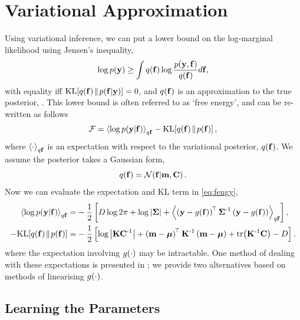 \documentclass{article} %
\begin{document}
\section{Variational Approximation}

Using variational inference, we can put a lower bound on the log-marginal
likelihood using Jensen's inequality, 
\begin{equation}
    \log p\!\left({\mathbf{y}}\right) \geq \int q\!\left({\mathbf{f}}\right) \log 
        \frac{p\!\left({\mathbf{y}, \mathbf{f}}\right)}{q\!\left({\mathbf{f}}\right)} d\mathbf{f},
\end{equation}
with equality iff $\text{KL}\!\left[{{q\!\left({\mathbf{f}}\right)}\!\parallel\!{p\!\left({\mathbf{f}}\middle\vert{\ensuremath{\mathbf{y}}}\right)}}\right] = 0$, and
$q\!\left({\mathbf{f}}\right)$ is an approximation to the true posterior,
\probC{\lstate}{\obs}. This lower bound is often referred to as `free energy',
and can be re-written as follows
\begin{equation}
    \mathcal{F} = \left\langle{\log \ensuremath{p\!\left({\mathbf{y}}\middle\vert{\ensuremath{\mathbf{f}}}\right)}}\right\rangle_{q\mathbf{f}}
        - \text{KL}\!\left[{{q\!\left({\mathbf{f}}\right)}\!\parallel\!{p\!\left({\mathbf{f}}\right)}}\right],
    \label{eq:fengy}
\end{equation}
where $\left\langle{\cdot}\right\rangle_{q\mathbf{f}}$ is an expectation with respect to the
variational posterior, $q\!\left({\mathbf{f}}\right)$. We assume the posterior takes a
Gaussian form,
\begin{equation}
    q\!\left({\mathbf{f}}\right) = \mathcal{N}\!\left({\mathbf{f}}\middle\vert{\ensuremath{\mathbf{m}}, \ensuremath{\mathbf{C}}}\right). \label{eq:varpost}
\end{equation}
Now we can evaluate the expectation and KL term in \eqref{eq:fengy},
\begin{align}
    \expec{q\lstate}{\log \probC{\obs}{\lstate}}
        =& - \frac{1}{2} \sbrac{ 
            D\log{2\pi} + \log\deter{\lcov} 
            + \expec{q\lstate}{\brac{\obs - \nonlin{\lstate}}\transpose\lcov\inv
            \brac{\obs - \nonlin{\lstate}}}},
            \label{eq:qlike} \\
     - \KL{\qrob{\lstate}}{\prob{\lstate}}
        =& - \frac{1}{2} \sbrac{\log\deter{\prcov\pocov\inv}
            + \brac{\pomean - \prmean}\transpose\prcov\inv
            \brac{\pomean - \prmean}
            + \trace{\prcov\inv\pocov} - D } \label{eq:qkl}.
\end{align}
where the expectation involving $g\!\left({{\cdot}}\right)$ may be intractable. One method
of dealing with these expectations is presented in \cite{Opper2009}; we provide
two alternatives based on methods of linearising $g\!\left({{\cdot}}\right)$.


\subsection{Learning the Parameters}
\end{document}
